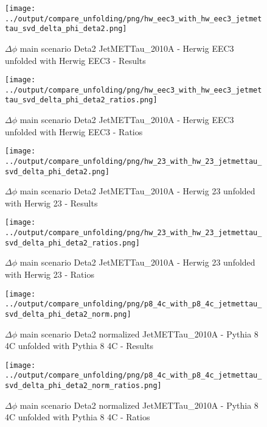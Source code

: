 \documentclass[11pt]{book}
\begin{document}
\begin{figure}[ht]
\centering
\texttt{[image: ../output/compare\_unfolding/png/hw\_eec3\_with\_hw\_eec3\_jetmettau\_svd\_delta\_phi\_deta2.png]}
\caption{$\Delta\phi$ main scenario Deta2 JetMETTau\_2010A - Herwig EEC3 unfolded with Herwig EEC3 - Results}
\label{hw_eec3_hw_eec3_jetmettau_svd_delta_phi_deta2_a}
\end{figure}

\begin{figure}[ht]
\centering
\texttt{[image: ../output/compare\_unfolding/png/hw\_eec3\_with\_hw\_eec3\_jetmettau\_svd\_delta\_phi\_deta2\_ratios.png]}
\caption{$\Delta\phi$ main scenario Deta2 JetMETTau\_2010A - Herwig EEC3 unfolded with Herwig EEC3 - Ratios}
\label{hw_eec3_hw_eec3_jetmettau_svd_delta_phi_deta2_b}
\end{figure}

\begin{figure}[ht]
\centering
\texttt{[image: ../output/compare\_unfolding/png/hw\_23\_with\_hw\_23\_jetmettau\_svd\_delta\_phi\_deta2.png]}
\caption{$\Delta\phi$ main scenario Deta2 JetMETTau\_2010A - Herwig 23 unfolded with Herwig 23 - Results}
\label{hw_23_hw_23_jetmettau_svd_delta_phi_deta2_a}
\end{figure}

\begin{figure}[ht]
\centering
\texttt{[image: ../output/compare\_unfolding/png/hw\_23\_with\_hw\_23\_jetmettau\_svd\_delta\_phi\_deta2\_ratios.png]}
\caption{$\Delta\phi$ main scenario Deta2 JetMETTau\_2010A - Herwig 23 unfolded with Herwig 23 - Ratios}
\label{hw_23_hw_23_jetmettau_svd_delta_phi_deta2_b}
\end{figure}


\begin{figure}[ht]
\centering
\texttt{[image: ../output/compare\_unfolding/png/p8\_4c\_with\_p8\_4c\_jetmettau\_svd\_delta\_phi\_deta2\_norm.png]}
\caption{$\Delta\phi$ main scenario Deta2 normalized JetMETTau\_2010A - Pythia 8 4C unfolded with Pythia 8 4C - Results}
\label{p8_p8_jetmettau_svd_delta_phi_deta2_norm_a}
\end{figure}

\begin{figure}[ht]
\centering
\texttt{[image: ../output/compare\_unfolding/png/p8\_4c\_with\_p8\_4c\_jetmettau\_svd\_delta\_phi\_deta2\_norm\_ratios.png]}
\caption{$\Delta\phi$ main scenario Deta2 normalized JetMETTau\_2010A - Pythia 8 4C unfolded with Pythia 8 4C - Ratios}
\label{p8_p8_jetmettau_svd_delta_phi_deta2_norm_b}
\end{figure}
\end{document}

